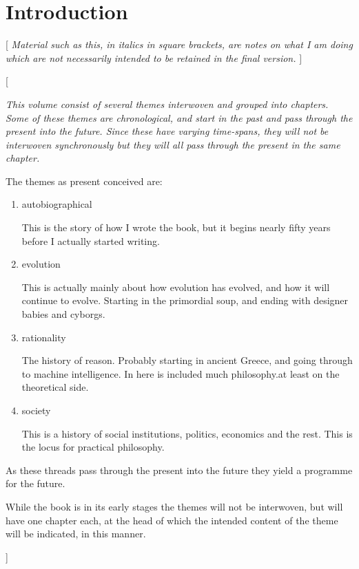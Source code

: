
\def\wiki#1{#1\index{#1} \footnote{\href{http://wikipedia.org/wiki/#1}{http://wikpedia.org/wiki/#1}}}
\def\Wiki#1{\footnote{\href{http://wikipedia.org/wiki/#1}{http://wikpedia.org/wiki/#1}}}

\chapter{Introduction}

[{\it
Material such as this, in italics in square brackets, are notes on what I am doing which are not necessarily intended to be retained in the final version.
}]

[{\it
This volume consist of several themes interwoven and grouped into chapters.
Some of these themes are chronological, and start in the past and pass through the present into the future.
Since these have varying time-spans, they will not be interwoven synchronously but they will all pass through the present in the same chapter.

The themes as present conceived are:

\begin{enumerate}
\item autobiographical

This is the story of how I wrote the book, but it begins nearly fifty years before I actually started writing.

\item evolution

This is actually mainly about how evolution has evolved, and how it will continue to evolve.
Starting in the primordial soup, and ending with designer babies and cyborgs.

\item rationality

The history of reason.
Probably starting in ancient Greece, and going through to machine intelligence.
In here is included much philosophy.at least on the theoretical side.

\item society

This is a history of social institutions, politics, economics and the rest.
This is the locus for practical philosophy.

\end{enumerate}

As these threads pass through the present into the future they yield a programme for the future.

While the book is in its early stages the themes will not be interwoven, but will have one chapter each, at the head of which the intended content of the theme will be indicated, in this manner.
}]

